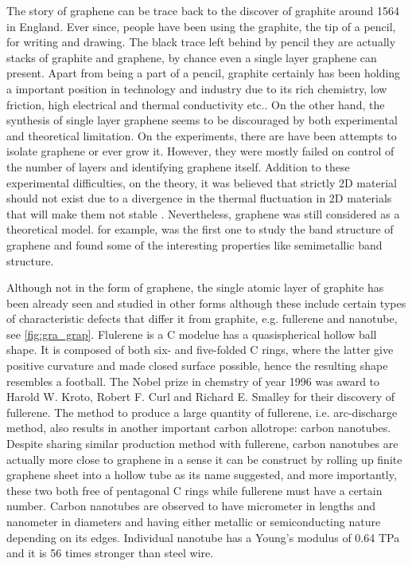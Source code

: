The story of graphene can be trace back to the discover of graphite around 1564 in England\cite{petroski1990pencil}. Ever since, people have been using the graphite, the tip of a pencil, for writing and drawing. The black trace left behind by pencil they are actually stacks of graphite and graphene, by chance even a single layer graphene can present.  Apart from being a part of a pencil, graphite certainly has been holding a important position in technology and industry due to its rich chemistry, low friction, high electrical and thermal conductivity etc.. On the other hand, the synthesis of single layer graphene seems to be discouraged by both experimental and theoretical limitation. On the experiments, there are have been attempts\cite{Krishnan1997,Ohashi1997,Dresselhaus2002,Shioyama2001} to isolate graphene or ever grow it. However, they were mostly failed on control of the number of layers and identifying graphene itself.  Addition to these experimental difficulties, on the theory, it was believed that strictly 2D material should not exist due to a divergence in the thermal fluctuation in 2D materials that will make them not stable \cite{Peierls1935,Landau1937,Mermin1968}. Nevertheless, graphene was still considered as a theoretical model. for example, \citet{Wallace1947} was the first one to study the band structure of graphene \cite{CastroNeto2009} and found some of the interesting properties like semimetallic band structure. 

Although not in the form of graphene, the single atomic layer of graphite has been already seen and studied in other forms although these include certain types of characteristic defects that differ it from graphite, e.g. fullerene and nanotube, see \autoref{fig:gra_grap}. Flulerene is a C modelue has a quasispherical hollow ball shape. It is composed of both six- and five-folded C rings, where the latter give positive curvature and made closed surface possible, hence the resulting shape resembles a football\cite{Kroto1985,Lamb1990}. The Nobel prize in chemstry of year 1996 was award to Harold W. Kroto, Robert F. Curl and Richard E. Smalley for their discovery of fullerene. The method to produce a large quantity of fullerene, i.e. arc-discharge method\cite{Lamb1990}, also results in another important carbon allotrope: carbon nanotubes\cite{Iijima1993}. Despite sharing similar production method with fullerene, carbon nanotubes are actually more close to graphene in a sense it can be construct by rolling up finite graphene sheet into a hollow tube as its name suggested, and more importantly, these two both free of pentagonal C rings while fullerene must have a certain number. Carbon nanotubes are observed to have micrometer in lengths and nanometer in diameters and having either metallic or semiconducting nature depending on its edges. Individual nanotube has a Young's modulus of 0.64 TPa and it is 56 times stronger than steel wire\cite{Baughman787}.

